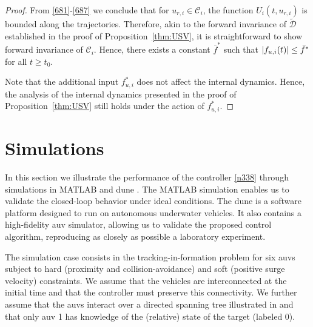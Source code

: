 \begin{proof}
	From \eqref{681}-\eqref{687} we conclude that for $u_{r, i}\in\mathcal{C}_i$, the function $U_i(t,u_{r, i})$ is bounded along the trajectories. Therefore, akin to the forward invariance of $\mathcal{\tilde D}$ established in the proof of Proposition~\ref{thm:USV}, it is straightforward to show forward invariance of $\mathcal{C}_i$.
	Hence, there exists a constant $\bar{f}^*$ such that $\left|f_{u, i}(t)\right|\leq\bar{f}^*$ for all $t\geq t_0$.

	Note that the additional input $f_{u, i}^*$ does not affect the internal dynamics. Hence, the analysis of the internal dynamics presented in the proof of Proposition~\ref{thm:USV} still holds under the action of $f_{u, i}^*$.	
\end{proof}

\section{Simulations}
\label{sec:simulations}

In this section we illustrate the performance of the controller \eqref{n338} through simulations in MATLAB and \gls{dune} \cite{dune}.
The MATLAB simulation enables us to validate the closed-loop behavior under ideal conditions.
The \acrfull{dune} is a software platform designed to run on autonomous underwater vehicles. It also contains a high-fidelity \gls{auv} simulator, allowing us to validate the proposed control algorithm, reproducing as closely as possible a laboratory experiment.


The simulation case consists in the tracking-in-formation problem for six \glspl{auv} subject to hard (proximity and collision-avoidance) and soft (positive surge velocity) constraints.
We assume that the vehicles are interconnected at the initial time and that the controller must preserve this connectivity.
We further assume that the \glspl{auv} interact over a directed spanning tree illustrated in  and that only \gls{auv} 1 has knowledge of the (relative) state of the target (labeled 0).

